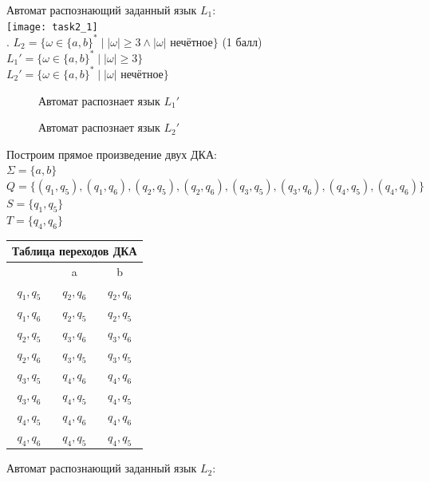 \documentclass{article}
\begin{document}
\normalsize{Автомат распознающий заданный язык \(L_1\): }\\
\texttt{[image: task2\_1]}\\
\hfill \break
\hfill \break
\hfill {}. \(L_2 = \{\omega  \in \{a,b\}^* \mid |\omega| \geq 3 \land |\omega| \text{ нечётное}\}\) (1 балл)\\
\hfill \break
\(L_1' = \{\omega  \in \{a,b\}^* \mid |\omega| \geq 3\}\)\\
\(L_2' = \{\omega  \in \{a,b\}^* \mid |\omega| \text{ нечётное}\}\)\\
\begin{figure}[h]
\caption{Автомат распознает язык \(L_1'\)}
\end{figure}
\hfill \break
\begin{figure}[h]
\caption{Автомат распознает язык \(L_2'\)}
\end{figure}
\hfill \break
\normalsize{Построим прямое произведение двух ДКА:}\\
\(\Sigma = \{a,b\}\)\\
\(Q = \{(q_1,q_5), (q_1,q_6),(q_2,q_5),(q_2,q_6),(q_3,q_5),(q_3,q_6),(q_4,q_5),(q_4,q_6)\}\)\\
\(S = \{q_1,q_5\}\)\\
\(T = \{q_4,q_6\}\)\\
\begin{center}
\begin{tabular} {|c |c |c|}
\hline
\multicolumn{3}{|c|}{Таблица переходов ДКА} \\
\hline
 & a & b \\
\hline
\(q_1,q_5\) & \(q_2,q_6\) & \(q_2,q_6\) \\
\hline
\(q_1,q_6\) & \(q_2,q_5\) & \(q_2,q_5\) \\
\hline
\(q_2,q_5\) & \(q_3,q_6\) & \(q_3,q_6\) \\
\hline
\(q_2,q_6\) & \(q_3,q_5\) & \(q_3,q_5\) \\
\hline
\(q_3,q_5\) & \(q_4,q_6\) & \(q_4,q_6\) \\
\hline
\(q_3,q_6\) & \(q_4,q_5\) & \(q_4,q_5\) \\
\hline
\(q_4,q_5\) & \(q_4,q_6\) & \(q_4,q_6\) \\
\hline
\(q_4,q_6\) & \(q_4,q_5\) & \(q_4,q_5\) \\
\hline
\end{tabular}
\end{center}
\normalsize{Автомат распознающий заданный язык \(L_2\): }\\\\
\end{document}
